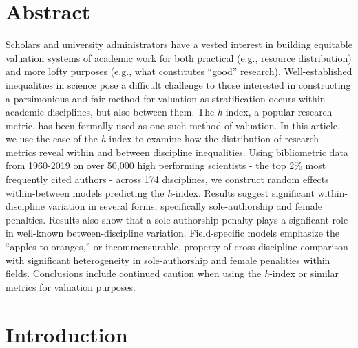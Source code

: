 \documentclass[
  10pt,
  letterpaper,
]{article}
\begin{document}
\newpage

\begin{flushleft}
{\Large
\textbf{}
}
\newline
\end{flushleft}

\section*{Abstract}
Scholars and university administrators have a vested interest in
building equitable valuation systems of academic work for both practical
(e.g., resource distribution) and more lofty purposes (e.g., what
constitutes ``good'' research). Well-established inequalities in science
pose a difficult challenge to those interested in constructing a
parsimonious and fair method for valuation as stratification occurs
within academic disciplines, but also between them. The \emph{h}-index,
a popular research metric, has been formally used as one such method of
valuation. In this article, we use the case of the \emph{h}-index to
examine how the distribution of research metrics reveal within and
between discipline inequalities. Using bibliometric data from 1960-2019
on over 50,000 high performing scientists - the top 2\% most frequently
cited authors - across 174 disciplines, we construct random effects
within-between models predicting the \emph{h}-index. Results suggest
significant within-discipline variation in several forms, specifically
sole-authorship and female penalties. Results also show that a sole
authorship penalty plays a signficant role in well-known
between-discipline variation. Field-specific models emphasize the
``apples-to-oranges,'' or incommensurable, property of cross-discipline
comparison with significant heterogeneity in sole-authorship and female
penalities within fields. Conclusions include continued caution when
using the \emph{h}-index or similar metrics for valuation purposes.


\linenumbers
\section{Introduction}\label{introduction}
\end{document}
